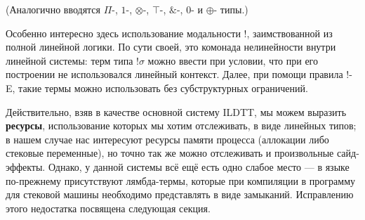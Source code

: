 \documentclass[12pt]{article}
\DeclareMathOperator{\inn}{in}
\DeclareMathOperator{\lett}{let}
\DeclareMathOperator{\type}{type}
\newcommand{\letin}[3]{\lett\,#1=#2\,\inn\,#3}
\begin{document}

(Аналогично вводятся $\Pi$-, $1$-, $\otimes$-, $\top$-, $\&$-, $0$- и $\oplus$-
типы.)

Особенно интересно здесь использование модальности $!$, заимствованной из полной
линейной логики. По сути своей, это комонада нелинейности внутри линейной
системы: терм типа $!\sigma$ можно ввести при условии, что при его построении не
использовался линейный контекст. Далее, при помощи правила $!$-E, такие
термы можно использовать без субструктурных ограничений.

Действительно, взяв в качестве основной систему ILDTT, мы можем выразить
\textbf{ресурсы}, использование которых мы хотим отслеживать, в виде линейных
типов; в нашем случае нас интересуют ресурсы памяти процесса (аллокации либо
стековые переменные), но точно так же можно отслеживать и произвольные
сайд-эффекты. Однако, у данной системы всё ещё есть одно слабое место --- в
языке по-прежнему присутствуют лямбда-термы, которые при компиляции в программу
для стековой машины необходимо представлять в виде замыканий. Исправлению этого
недостатка посвящена следующая секция.
\end{document}
